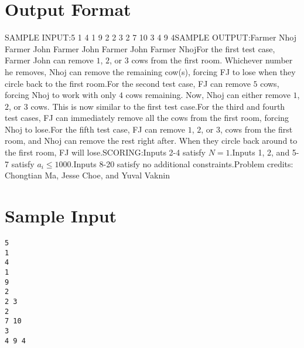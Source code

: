 \documentclass[12pt]{article}
\begin{document}
\section*{Output Format}
SAMPLE INPUT:5
1
4
1
9
2
2 3
2
7 10
3
4 9 4SAMPLE OUTPUT:Farmer Nhoj
Farmer John
Farmer John
Farmer John
Farmer NhojFor the first test case, Farmer John can remove $1$, $2$, or $3$ cows from  the
first room. Whichever number he removes, Nhoj can remove the remaining cow(s),
forcing FJ to lose when they circle back to the first room.For the second test case, FJ can remove $5$ cows, forcing Nhoj to work with only
$4$ cows remaining. Now, Nhoj can either remove $1$, $2$, or $3$ cows. This is
now similar to the first test case.For the third and fourth test cases, FJ can immediately remove all the cows from
the first room, forcing Nhoj to lose.For the fifth test case, FJ can remove $1$, $2$, or $3$, cows from the first
room, and Nhoj can remove the rest right after. When they circle back around to
the first room, FJ will lose.SCORING:Inputs 2-4 satisfy $N=1$.Inputs 1, 2, and 5-7 satisfy $a_i\le 1000$.Inputs 8-20 satisfy no additional constraints.Problem credits: Chongtian Ma, Jesse Choe, and Yuval Vaknin

\section*{Sample Input}
\begin{verbatim}
5
1
4
1
9
2
2 3
2
7 10
3
4 9 4
\end{verbatim}
\end{document}
